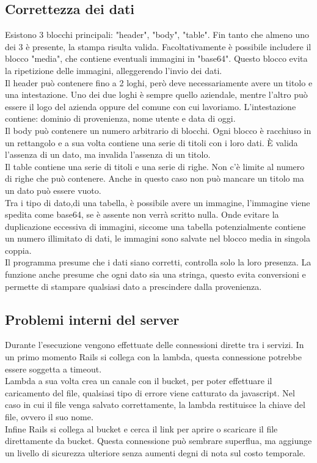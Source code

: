 \documentclass[12pt]{article}
\begin{document}
\subsection{Correttezza dei dati}
Esistono 3 blocchi principali: "header", "body", "table".
Fin tanto che almeno uno dei 3 è presente, la stampa risulta valida.
Facoltativamente è possibile includere il blocco "media", che contiene 
eventuali immagini in "base64". Questo blocco evita la ripetizione delle immagini, 
alleggerendo l'invio dei dati.
\\ Il header può contenere fino a 2 loghi, però deve necessariamente avere 
un titolo e una intestazione. 
Uno dei due loghi è sempre quello aziendale, mentre l'altro può essere il logo 
del azienda oppure del comune con cui lavoriamo.
L'intestazione contiene: dominio di provenienza, nome utente e data di oggi.
\\ Il body può contenere un numero arbitrario di blocchi. Ogni blocco è racchiuso 
in un rettangolo e a sua volta contiene una serie di titoli con i loro dati. 
È valida l'assenza di un dato, ma invalida l'assenza di un titolo. 
\\ Il table contiene una serie di titoli e una serie di righe. Non c'è limite 
al numero di righe che può contenere.
Anche in questo caso non può mancare un titolo ma un dato può essere vuoto. 
\\ Tra i tipo di dato,di una tabella, 
è possibile avere un immagine, l'immagine viene spedita come 
base64, se è assente non verrà scritto nulla. Onde evitare la duplicazione 
eccessiva di immagini, siccome una tabella potenzialmente contiene un numero 
illimitato di dati, le immagini sono salvate nel blocco media in singola coppia. 
\\ Il programma presume che i dati siano corretti, controlla solo la loro presenza.
La funzione anche presume che ogni dato sia una stringa, questo evita conversioni 
e permette di stampare qualsiasi dato a prescindere dalla provenienza.

\subsection{Problemi interni del server}
Durante l'esecuzione vengono effettuate delle connessioni dirette tra i servizi. 
In un primo momento Rails si collega con la lambda, questa connessione potrebbe 
essere soggetta a timeout. 
\\ Lambda a sua volta crea un canale con il bucket, per poter 
effettuare il caricamento del file, qualsiasi tipo di errore viene catturato da javascript.
Nel caso in cui il file venga salvato correttamente,
la lambda restituisce la chiave del file, ovvero il suo nome. 
\\ Infine Rails si collega al bucket e cerca il link per aprire o scaricare il file 
direttamente da bucket.
Questa connessione può sembrare superflua, ma aggiunge 
un livello di sicurezza ulteriore senza aumenti degni di nota sul costo temporale. 
\end{document}
